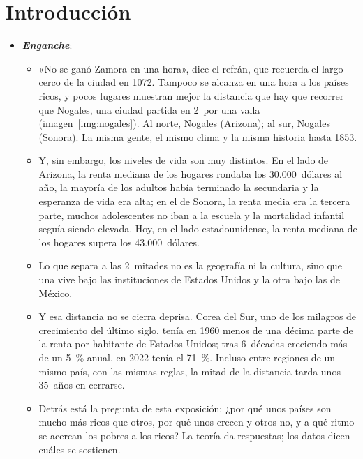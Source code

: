 \documentclass[11pt]{article}
\begin{document}
\tceetitulo

\section*{Introducción}

\begin{imagen}[H]
\centering
\caption{La valla de la frontera en Nogales: en primer plano, el lado de Arizona; detrás, las casas de Nogales (Sonora)}\label{img:nogales}
\end{imagen}

\begin{itemize}
\item \textbf{\emph{Enganche}}:
  \begin{itemize}
  \item «No se ganó Zamora en una hora», dice el refrán, que recuerda el largo cerco de la ciudad en 1072. Tampoco se alcanza en una hora a los países ricos, y pocos lugares muestran mejor la distancia que hay que recorrer que Nogales, una ciudad partida en 2~por una valla (imagen~\ref{img:nogales}). Al norte, Nogales (Arizona); al sur, Nogales (Sonora). La misma gente, el mismo clima y la misma historia hasta 1853.
  \item Y, sin embargo, los niveles de vida son muy distintos. En el lado de Arizona, la renta mediana de los hogares rondaba los 30.000~dólares al año, la mayoría de los adultos había terminado la secundaria y la esperanza de vida era alta; en el de Sonora, la renta media era la tercera parte, muchos adolescentes no iban a la escuela y la mortalidad infantil seguía siendo elevada\nocite{AcemogluRobinson2012}. Hoy, en el lado estadounidense, la renta mediana de los hogares supera los 43.000~dólares\nocite{Census2025ACSNogales}.
  \item Lo que separa a las 2~mitades no es la geografía ni la cultura, sino que una vive bajo las instituciones de Estados Unidos y la otra bajo las de México.
  \item Y esa distancia no se cierra deprisa. Corea del Sur, uno de los milagros de crecimiento del último siglo, tenía en 1960 menos de una décima parte de la renta por habitante de Estados Unidos; tras 6~décadas creciendo más de un 5~\% anual, en 2022 tenía el 71~\%\nocite{BoltvanZanden2025}. Incluso entre regiones de un mismo país, con las mismas reglas, la mitad de la distancia tarda unos 35~años en cerrarse\nocite{BarroSalaiMartin2004}.
  \item Detrás está la pregunta de esta exposición: ¿por qué unos países son mucho más ricos que otros, por qué unos crecen y otros no, y a qué ritmo se acercan los pobres a los ricos? La teoría da respuestas; los datos dicen cuáles se sostienen.
  \end{itemize}


\end{itemize}
\end{document}
